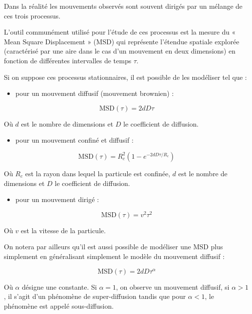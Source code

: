 \documentclass[12pt,a4paper,twoside,openright]{book}
\providecommand{\tightlist}{%
  \setlength{\itemsep}{0pt}\setlength{\parskip}{0pt}}
\begin{document}
Dans la réalité les mouvements observés sont souvent dirigés par un
mélange de ces trois processus.

L'outil communément utilisé pour l'étude de ces processus est la mesure
du « Mean Square Displacement » (MSD) qui représente l'étendue spatiale
explorée (caractérisé par une aire dans le cas d'un mouvement en deux
dimensions) en fonction de différentes intervalles de temps \(\tau\).

Si on suppose ces processus stationnaires, il est possible de les
modéliser tel que :

\begin{itemize}
\tightlist
\item
  pour un mouvement diffusif (mouvement brownien) :
\end{itemize}

\[
\mbox{MSD}(\tau) = 2dD\tau
\]

Où \(d\) est le nombre de dimensions et \(D\) le coefficient de
diffusion.

\begin{itemize}
\tightlist
\item
  pour un mouvement confiné et diffusif :
\end{itemize}

\[
\mbox{MSD}(\tau) = R_c^2(1-e^{-2dD\tau / R_c})
\]

Où \(R_c\) est la rayon dans lequel la particule est confinée, \(d\) est
le nombre de dimensions et \(D\) le coefficient de diffusion.

\begin{itemize}
\tightlist
\item
  pour un mouvement dirigé :
\end{itemize}

\[
\mbox{MSD}(\tau) = v^2\tau ^2
\]

Où \(v\) est la vitesse de la particule.

On notera par ailleurs qu'il est aussi possible de modéliser une MSD
plus simplement en généralisant simplement le modèle du mouvement
diffusif :

\[
\mbox{MSD}(\tau) = 2dD\tau ^ {\alpha}
\]

Où \(\alpha\) désigne une constante. Si \(\alpha = 1\), on observe un
mouvement diffusif, si \(\alpha > 1\), il s'agit d'un phénomène de
super-diffusion tandis que pour \(\alpha < 1\), le phénomène est appelé
sous-diffusion.
\end{document}
